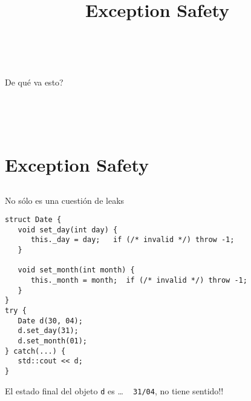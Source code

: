 

\title%
{Exception Safety}


\subject{Exception Safety}




\begin{frame}
   \titlepage
\end{frame}

~%
\begin{frame}{De qu\'e va esto?}
   \tableofcontents
\end{frame}
~%



~%
\section{Exception Safety}
\subsection{}
\begin{frame}[fragile]{No s\'olo es una cuesti\'on de leaks}
   \begin{lstlisting}[style=normal]
struct Date {
   void set_day(int day) {
      this._day = day;   if (/* invalid */) throw -1;
   }

   void set_month(int month) {
      this._month = month;  if (/* invalid */) throw -1;
   }
}
try {
   Date d(30, 04);
   d.set_day(31);
   d.set_month(01);
} catch(...) {
   std::cout << d;
}
   \end{lstlisting}
El estado final del objeto \lstinline[style=normal]!d! es \dots
~%
\pause
\lstinline[style=normal]!31/04!, no tiene sentido!!
~%
\end{frame}

